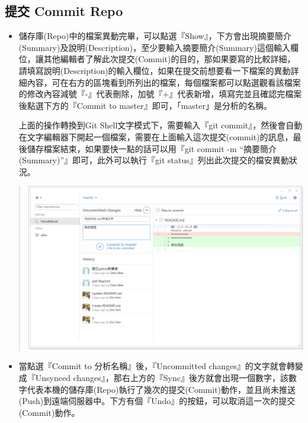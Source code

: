 \documentclass[letterpaper,10pt,english]{sphinxmanual}
\begin{document}
\subsection{提交 Commit Repo}
\label{_doc/writing/index-github:commit-repo}\begin{itemize}
\item {} 
儲存庫(Repo)中的檔案異動完畢，可以點選『Show』，下方會出現摘要簡介(Summary)及說明(Description)，至少要輸入摘要簡介(Summary)這個輸入欄位，讓其他編輯者了解此次提交(Commit)的目的，那如果要寫的比較詳細，請填寫說明(Description)的輸入欄位，如果在提交前想要看一下檔案的異動詳細內容，可在右方的區塊看到所列出的檔案，每個檔案都可以點選觀看該檔案的修改內容減號『-』代表刪除，加號『+』代表新增，填寫完並且確認完檔案後點選下方的『Commit to master』即可，「master」是分析的名稱。

上面的操作轉換到Git Shell文字模式下，需要輸入『git commit』，然後會自動在文字編輯器下開起一個檔案，需要在上面輸入這次提交(commit)的訊息，最後儲存檔案結束，如果要快一點的話可以用『git commit -m ``摘要簡介(Summary)''』即可，此外可以執行『git status』列出此次提交的檔安異動狀況。

\end{itemize}
\begin{quote}

\includegraphics{GitHub-Commit-002.png}
\end{quote}
\begin{itemize}
\item {} 
當點選『Commit to 分析名稱』後，『Uncommitted changes』的文字就會轉變成『Unsynced changes』，那右上方的『Sync』後方就會出現一個數字，該數字代表本機的儲存庫(Repo)執行了幾次的提交(Commit)動作，並且尚未推送(Push)到遠端伺服器中。下方有個『Undo』的按鈕，可以取消這一次的提交(Commit)動作。

\end{itemize}
\end{document}
